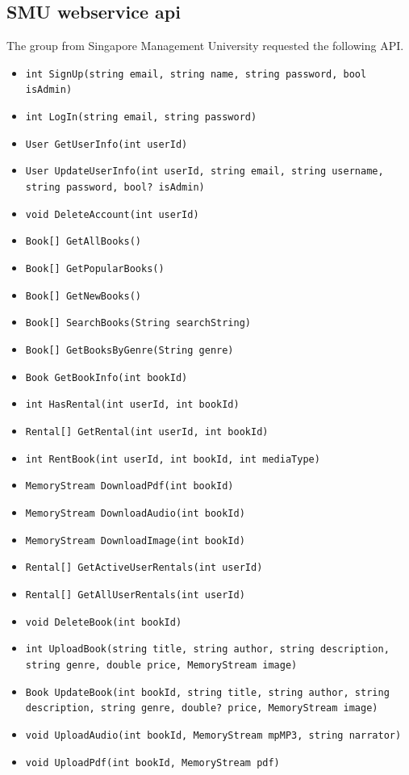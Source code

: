\documentclass[a4paper,11pt,report]{article}
\begin{document}
{\subsection{SMU webservice api}
The group from Singapore Management University requested the following API.

\begin{itemize}
	\item \texttt{int SignUp(string email, string name, string password, bool isAdmin)}
	\item \texttt{int LogIn(string email, string password)}
	\item \texttt{User GetUserInfo(int userId)}
	\item \texttt{User UpdateUserInfo(int userId, string email, string username, string password, bool? isAdmin)}
	\item \texttt{void DeleteAccount(int userId)}
	\item \texttt{Book[] GetAllBooks()}
	\item \texttt{Book[] GetPopularBooks()}
	\item \texttt{Book[] GetNewBooks()}
	\item \texttt{Book[] SearchBooks(String searchString)}
	\item \texttt{Book[] GetBooksByGenre(String genre)}
	\item \texttt{Book GetBookInfo(int bookId)}
	\item \texttt{int HasRental(int userId, int bookId)}
	\item \texttt{Rental[] GetRental(int userId, int bookId)}
	\item \texttt{int RentBook(int userId, int bookId, int mediaType)}
	\item \texttt{MemoryStream DownloadPdf(int bookId)}
	\item \texttt{MemoryStream DownloadAudio(int bookId)}
	\item \texttt{MemoryStream DownloadImage(int bookId)}
	\item \texttt{Rental[] GetActiveUserRentals(int userId)}
	\item \texttt{Rental[] GetAllUserRentals(int userId)}
	\item \texttt{void DeleteBook(int bookId)}
	\item \texttt{int UploadBook(string title, string author, string description, string genre, double price, MemoryStream image)}
	\item \texttt{Book UpdateBook(int bookId, string title, string author, string description, string genre, double? price, MemoryStream image)}
	\item \texttt{void UploadAudio(int bookId, MemoryStream mpMP3, string narrator)}
	\item \texttt{void UploadPdf(int bookId, MemoryStream pdf)}
\end{itemize}

}
\end{document}
